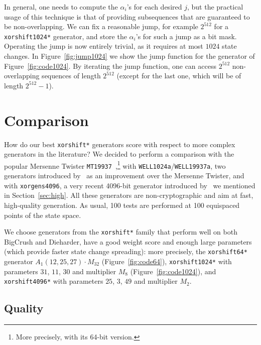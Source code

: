 \documentclass{acmsmalltr}
\newcommand{\xorshifts}[1][]{\texttt{xorshift#1*}\xspace}
\newcommand{\wella}{\texttt{WELL1024a}\xspace}
\newcommand{\wellb}{\texttt{WELL19937a}\xspace}
\newcommand{\mt}[1][]{\texttt{MT19937}\xspace}
\newcommand{\xorgens}[1][]{\texttt{xorgens#1}\xspace}
\begin{document}
In general, one needs to compute the $\alpha_i$'s for each desired $j$, but the
practical usage of this technique is that of providing subsequences that are
guaranteed to be non-overlapping. We can fix a reasonable jump, for example
$2^{512}$ for a \xorshifts[1024] generator, and store the $\alpha_i$'s for such a
jump as a bit mask. Operating the jump is now entirely trivial, as it requires
at most $1024$ state changes. In Figure~\ref{fig:jump1024} we show the jump function
for the generator of Figure~\ref{fig:code1024}. By iterating the jump function,
one can access $2^{512}$ non-overlapping sequences of length $2^{512}$ (except for
the last one, which will be of length $2^{512}-1$).

\section{Comparison}

How do our best \xorshifts generators score with respect to more complex
generators in the literature? We decided to perform a comparison with the
popular Mersenne Twister \mt~\cite{MaNMT},\footnote{More precisely, with its
64-bit version.} with \wella/\wellb, two generators introduced by~ as an improvement over the Mersenne Twister, and
with \xorgens[4096], a very recent 4096-bit generator introduced by~
we mentioned in Section~\ref{sec:high}. All these generators are
non-cryptographic and aim at fast, high-quality generation.
As usual, 100 tests are performed at 100 equispaced points of the state space.

We choose generators from the \xorshifts family that
perform well on both BigCrush and Dieharder, have a good weight score and enough
large parameters (which provide faster state change spreading): more
precisely, the \xorshifts[64] generator $A_1(12,25,27)\cdot M_{32}$ (Figure~\ref{fig:code64}), 
\xorshifts[1024] with parameters $31$, $11$, $30$ and multiplier $M_8$
(Figure~\ref{fig:code1024}), and \xorshifts[4096] with parameters $25$, $3$, $49$
and multiplier $M_2$.

\subsection{Quality}
\end{document}
